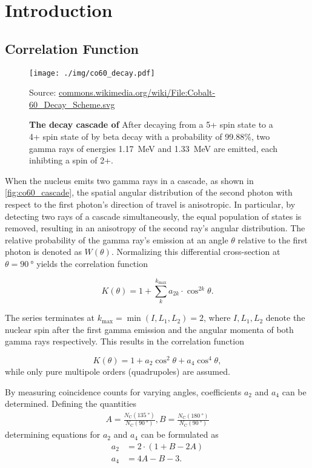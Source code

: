 \chapter{Introduction}

\section{Correlation Function}
\begin{figure}[tbp]
	\centering
	\texttt{[image: ./img/co60\_decay.pdf]}
	\caption*{Source: \url{commons.wikimedia.org/wiki/File:Cobalt-60_Decay_Scheme.svg}}
	\caption[The decay cascade of ]{\textbf{The decay cascade of } After decaying from a 5+ spin state to a 4+ spin state of  by beta decay with a probability of \num{99.88}\%, two gamma rays of energies \SI{1.17}{\MeV} and \SI{1.33}{\MeV} are emitted, each inhibting a spin of 2+.}
	\label{fig:co60_cascade}
\end{figure}
When the nucleus emits two gamma rays in a cascade, as shown in \autoref{fig:co60_cascade}, the spatial angular distribution of the second photon with respect to the first photon's direction of travel is anisotropic.
In particular, by detecting two rays of a cascade simultaneously, the equal population of states is removed, resulting in an anisotropy of the second ray's angular distribution.
The relative probability of the gamma ray's emission at an angle $\theta$ relative to the first photon is denoted as $W(\theta)$.
Normalizing this differential cross-section at $\theta=\SI{90}{\degree}$ yields the correlation function

\begin{equation*}
	K(\theta) = 1 + \sum_{k}^{k_\text{max}}a_{2k}\cdot\cos^{2k}{\theta}.
\end{equation*}

The series terminates at $k_\text{max}=\min(I, L_1, L_2)=2$, where $I, L_1, L_2$ denote the nuclear spin after the first gamma emission and the angular momenta of both gamma rays respectively.
This results in the correlation function

\begin{equation}\label{eq:corr_func}
	K(\theta) = 1 + a_2\cos^{2}{\theta} + a_4\cos^{4}{\theta},
\end{equation}
while only pure multipole orders (quadrupoles) are assumed.

By measuring coincidence counts for varying angles, coefficients $a_2$ and $a_4$ can be determined.
Defining the quantities
\begin{gather*}
	A=\frac{N_\text{C}(\SI{135}{\degree})}{N_\text{C}(\SI{90}{\degree})}, B=\frac{N_\text{C}(\SI{180}{\degree})}{N_\text{C}(\SI{90}{\degree})}
\end{gather*}
determining equations for $a_2$ and $a_4$ can be formulated as
\begin{align}
	a_2 &= 2\cdot(1+B-2A) \label{eq:a2}\\
	a_4 &= 4A-B-3. \label{eq:a4}
\end{align}

